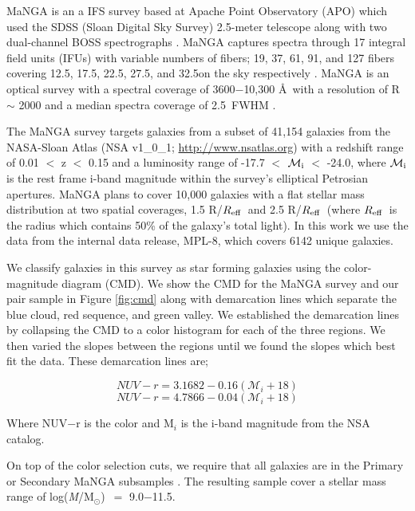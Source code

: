 \documentclass[iop,revtex4,twocolumn,apj,numberedappendix,appendixfloats]{emulateapj}
\newcommand{\reff}{$R_{\rm eff}$}
\newcommand{\logm}{log({\it M}/M$_{\odot}$)}
\begin{document}
MaNGA is an a IFS survey based at Apache Point Observatory (APO) which used the SDSS (Sloan Digital Sky Survey) 2.5-meter telescope along with two dual-channel BOSS spectrographs \citep{Drory:2015}. MaNGA captures spectra through 17 integral field units (IFUs) with variable numbers of fibers; 19, 37, 61, 91, and 127 fibers covering 12.5\arcsec, 17.5\arcsec, 22.5\arcsec, 27.5\arcsec, and 32.5\arcsec on the sky respectively \citet{Law:2015}. MaNGA is an optical survey with a spectral coverage of 3600$-$10,300 \AA\ with a resolution of R $\sim$ 2000 and a median spectra coverage of 2.5\arcsec\ FWHM \citep{Bundy:2015}. 

The MaNGA survey targets galaxies from a subset of 41,154 galaxies from the NASA-Sloan Atlas (NSA v1\_0\_1; \url{http://www.nsatlas.org}) with a redshift range of 0.01 $<$ z $<$ 0.15 and a luminosity range of -17.7 $<$ $\mathcal{M_{\rm i}}$ $<$ -24.0, where $\mathcal{M_{\rm i}}$ is the rest frame i-band magnitude within the survey's elliptical Petrosian apertures. MaNGA plans to cover 10,000 galaxies with a flat stellar mass distribution at two spatial coverages, 1.5 R/\reff\ and 2.5 R/\reff\ (where \reff\ is the radius which contains 50\% of the galaxy's total light). In this work we use the data from the internal data release, MPL-8, which covers 6142 unique galaxies. 

We classify galaxies in this survey as star forming galaxies using the color-magnitude diagram (CMD). We show the CMD for the MaNGA survey and our pair sample in Figure \ref{fig:cmd} along with demarcation lines which separate the blue cloud, red sequence, and green valley. We established the demarcation lines by collapsing the CMD to a color histogram for each of the three regions. We then varied the slopes between the regions until we found the slopes which best fit the data. These demarcation lines are;

\begin{equation}\label{eq:blue}
NUV-r = 3.1682 - 0.16 (\mathcal{M}_i+18)
\end{equation}
\begin{equation}\label{eq:red}
NUV-r = 4.7866 - 0.04 (\mathcal{M}_i+18)
\end{equation}

Where NUV$-$r is the color and M$_i$ is the i-band magnitude from the NSA catalog. 

On top of the color selection cuts, we require that all galaxies are in the Primary or Secondary MaNGA subsamples \citep{Wake:2017}. The resulting sample cover a stellar mass range of \logm\ $=$ 9.0$-$11.5.
\end{document}

